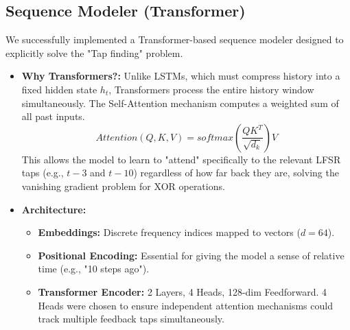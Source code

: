 \documentclass[12pt,a4paper]{report}
\theoremstyle{plain}
\begin{document}
\subsection{Sequence Modeler (Transformer)}
We successfully implemented a Transformer-based sequence modeler designed to explicitly solve the "Tap finding" problem.
\begin{itemize}
    \item \textbf{Why Transformers?:} Unlike LSTMs, which must compress history into a fixed hidden state $h_t$, Transformers process the entire history window simultaneously. The Self-Attention mechanism computes a weighted sum of all past inputs.
    $$ Attention(Q, K, V) = softmax(\frac{QK^T}{\sqrt{d_k}})V $$
    This allows the model to learn to "attend" specifically to the relevant LFSR taps (e.g., $t-3$ and $t-10$) regardless of how far back they are, solving the vanishing gradient problem for XOR operations.
    \item \textbf{Architecture:}
    \begin{itemize}
        \item \textbf{Embeddings:} Discrete frequency indices mapped to vectors ($d=64$).
        \item \textbf{Positional Encoding:} Essential for giving the model a sense of relative time (e.g., "10 steps ago").
        \item \textbf{Transformer Encoder:} 2 Layers, 4 Heads, 128-dim Feedforward. 4 Heads were chosen to ensure independent attention mechanisms could track multiple feedback taps simultaneously.
    \end{itemize}
\end{itemize}
\end{document}

